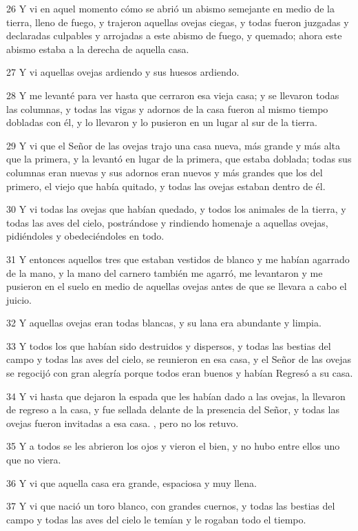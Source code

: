 \par 26 Y vi en aquel momento cómo se abrió un abismo semejante en medio de la tierra, lleno de fuego, y trajeron aquellas ovejas ciegas, y todas fueron juzgadas y declaradas culpables y arrojadas a este abismo de fuego, y quemado; ahora este abismo estaba a la derecha de aquella casa.
\par 27 Y vi aquellas ovejas ardiendo y sus huesos ardiendo.
\par 28 Y me levanté para ver hasta que cerraron esa vieja casa; y se llevaron todas las columnas, y todas las vigas y adornos de la casa fueron al mismo tiempo dobladas con él, y lo llevaron y lo pusieron en un lugar al sur de la tierra.
\par 29 Y vi que el Señor de las ovejas trajo una casa nueva, más grande y más alta que la primera, y la levantó en lugar de la primera, que estaba doblada; todas sus columnas eran nuevas y sus adornos eran nuevos y más grandes que los del primero, el viejo que había quitado, y todas las ovejas estaban dentro de él.
\par 30 Y vi todas las ovejas que habían quedado, y todos los animales de la tierra, y todas las aves del cielo, postrándose y rindiendo homenaje a aquellas ovejas, pidiéndoles y obedeciéndoles en todo.
\par 31 Y entonces aquellos tres que estaban vestidos de blanco y me habían agarrado de la mano, y la mano del carnero también me agarró, me levantaron y me pusieron en el suelo en medio de aquellas ovejas antes de que se llevara a cabo el juicio.
\par 32 Y aquellas ovejas eran todas blancas, y su lana era abundante y limpia.
\par 33 Y todos los que habían sido destruidos y dispersos, y todas las bestias del campo y todas las aves del cielo, se reunieron en esa casa, y el Señor de las ovejas se regocijó con gran alegría porque todos eran buenos y habían Regresó a su casa.
\par 34 Y vi hasta que dejaron la espada que les habían dado a las ovejas, la llevaron de regreso a la casa, y fue sellada delante de la presencia del Señor, y todas las ovejas fueron invitadas a esa casa. , pero no los retuvo.
\par 35 Y a todos se les abrieron los ojos y vieron el bien, y no hubo entre ellos uno que no viera.
\par 36 Y vi que aquella casa era grande, espaciosa y muy llena.
\par 37 Y vi que nació un toro blanco, con grandes cuernos, y todas las bestias del campo y todas las aves del cielo le temían y le rogaban todo el tiempo.
